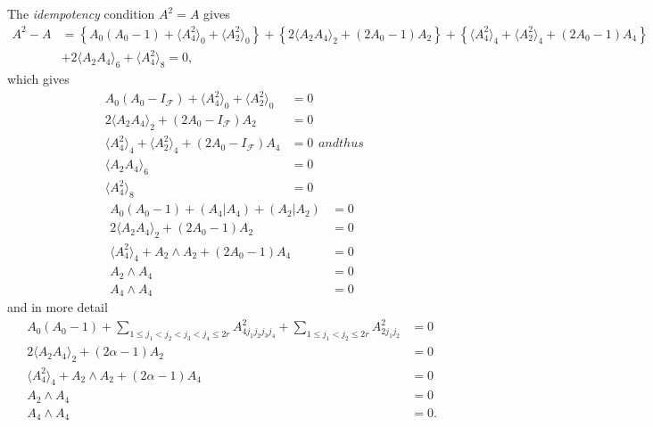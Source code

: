 \documentclass[aps, preprint]{revtex4}
\begin{document}
The \emph{idempotency} condition $A^{2} =A$ gives
\begin{align}A^{2} -A &  =\left \{A_{0} \left (A_{0} -1\right ) + \langle A_{4}^{2} \rangle _{0} + \langle A_{2}^{2} \rangle _{0}\right \} +\left \{2  \langle A_{2} A_{4} \rangle _{2} +\left (2 A_{0} -1\right ) A_{2}\right \} +\left \{ \langle A_{4}^{2} \rangle _{4} + \langle A_{2}^{2} \rangle _{4} +\left (2 A_{0} -1\right ) A_{4}\right \} \nonumber  \\
 &  +2  \langle A_{2} A_{4} \rangle _{6} + \langle A_{4}^{2} \rangle _{8} =0\text{,}\end{align}which gives
\label{idem cond}
\begin{subequations}
\begin{align}A_{0} \left (A_{0} -I_{\mathcal{F}}\right ) + \langle A_{4}^{2} \rangle _{0} + \langle A_{2}^{2} \rangle _{0} &  =0 \\
2  \langle A_{2} A_{4} \rangle _{2} +\left (2 A_{0} -I_{\mathcal{F}}\right ) A_{2} &  =0 \\
 \langle A_{4}^{2} \rangle _{4} + \langle A_{2}^{2} \rangle _{4} +\left (2 A_{0} -I_{\mathcal{F}}\right ) A_{4} &  =0 \\
 \langle A_{2} A_{4} \rangle _{6} &  =0 \\
 \langle A_{4}^{2} \rangle _{8} &  =0\end{align}and thus
\end{subequations}
\begin{align}A_{0} \left (A_{0} -1\right ) +\left (\left .A_{4}\right \vert A_{4}\right ) +\left (\left .A_{2}\right \vert A_{2}\right ) &  =0 \\
2  \langle A_{2} A_{4} \rangle _{2} +\left (2 A_{0} -1\right ) A_{2} &  =0 \\
 \langle A_{4}^{2} \rangle _{4} +A_{2} \wedge A_{2} +\left (2 A_{0} -1\right ) A_{4} &  =0 \\
A_{2} \wedge A_{4} &  =0 \\
A_{4} \wedge A_{4} &  =0\end{align}and in more detail
\begin{align}A_{0} \left (A_{0} -1\right ) +\sum _{1 \leq j_{1} <j_{2} <j_{3} <j_{4} \leq 2 r}A_{4 j_{1} j_{2} j_{3} j_{4}}^{2} +\sum _{1 \leq j_{1} <j_{2} \leq 2 r}A_{2 j_{1} j_{2}}^{2} &  =0 \\
2  \langle A_{2} A_{4} \rangle _{2} +\left (2 \alpha  -1\right ) A_{2} &  =0 \\
 \langle A_{4}^{2} \rangle _{4} +A_{2} \wedge A_{2} +\left (2 \alpha  -1\right ) A_{4} &  =0 \\
A_{2} \wedge A_{4} &  =0 \\
A_{4} \wedge A_{4} &  =0.\end{align}
\end{document}
